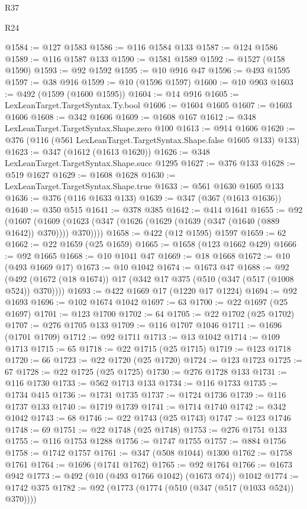 \begin{lexlean}{R37}
\begin{lexlean}{R24}
\begin{coremodule}
{{{{{{{{{{{{{{{{{{{{{{{{{{{{{{{{{{{{{{{{{{{{{{{{{{{{{{{{{{{{{{{{{{{{{{{{{{{{{{{{{{{{{{{{{{{{{{{{{{{{{{{{{{{{{{{{{{{{{{{{{{{{{{{{{{{{{{{{{{{{{{{{{{{{{{{{{{{{{{{{{{{{{{{{{{{{{{{{{{{{{{{{{@1584 := @127 @1583
@1586 := @116 @1584 @133
@1587 := @124 @1586
@1589 := @116 @1587 @133
@1590 := @1581 @1589
@1592 := @1527 (@158 @1590)
@1593 := @92 @1592
@1595 := @10 @916 @47
@1596 := @493 @1595
@1597 := @38 @916
@1599 := @10 (@1596 @1597)
@1600 := @10 @903
@1603 := @492 (@1599 (@1600 @1595))
@1604 := @14 @916
@1605 := LexLeanTarget.TargetSyntax.Ty.bool
@1606 := @1604 @1605
@1607 := @1603 @1606
@1608 := @342 @1606
@1609 := @1608 @167
@1612 := @348 LexLeanTarget.TargetSyntax.Shape.zero @100
@1613 := @914 @1606
@1620 := @376 (@116 (@561 LexLeanTarget.TargetSyntax.Shape.false @1605 @133) @133)
@1623 := @347 (@1612 (@1613 @1620))
@1626 := @348 LexLeanTarget.TargetSyntax.Shape.succ @1295
@1627 := @376 @133
@1628 := @519 @1627
@1629 := @1608 @1628
@1630 := LexLeanTarget.TargetSyntax.Shape.true
@1633 := @561 @1630 @1605 @133
@1636 := @376 (@116 @1633 @133)
@1639 := @347 (@367 (@1613 @1636))
@1640 := @350 @515
@1641 := @378 @385
@1642 := @414 @1641
@1655 := @92
    (@1607 (@1609 (@1623 (@347 (@1626 (@1629 (@1639 (@347 (@1640 (@889 @1642)) @370)))) @370))))
@1658 := @422 (@12 @1595) @1597
@1659 := 62
@1662 := @22 @1659 (@25 @1659)
@1665 := @1658 (@123 @1662 @429)
@1666 := @92 @1665
@1668 := @10 @1041 @47
@1669 := @18 @1668
@1672 := @10 (@493 @1669 @17)
@1673 := @10 @1042
@1674 := @1673 @47
@1688 := @92 (@492 (@1672 (@18 @1674)) @17 (@342 @17 @375 (@510 (@347 (@517 (@1008 @524)) @370))))
@1693 := @422 @1669 @17 (@1220 @17 @1224)
@1694 := @92 @1693
@1696 := @102 @1674 @1042
@1697 := 63
@1700 := @22 @1697 (@25 @1697)
@1701 := @123 @1700
@1702 := 64
@1705 := @22 @1702 (@25 @1702)
@1707 := @276 @1705 @133
@1709 := @116 @1707 @1046
@1711 := @1696 (@1701 @1709)
@1712 := @92 @1711
@1713 := @13 @1042
@1714 := @109 @1713
@1715 := 65
@1718 := @22 @1715 (@25 @1715)
@1719 := @123 @1718
@1720 := 66
@1723 := @22 @1720 (@25 @1720)
@1724 := @123 @1723
@1725 := 67
@1728 := @22 @1725 (@25 @1725)
@1730 := @276 @1728 @133
@1731 := @116 @1730
@1733 := @562 @1713 @133
@1734 := @116 @1733
@1735 := @1734 @415
@1736 := @1731 @1735
@1737 := @1724 @1736
@1739 := @116 @1737 @133
@1740 := @1719 @1739
@1741 := @1714 @1740
@1742 := @342 @1042
@1743 := 68
@1746 := @22 @1743 (@25 @1743)
@1747 := @123 @1746
@1748 := 69
@1751 := @22 @1748 (@25 @1748)
@1753 := @276 @1751 @133
@1755 := @116 @1753 @1288
@1756 := @1747 @1755
@1757 := @884 @1756
@1758 := @1742 @1757
@1761 := @347 (@508 @1044) @1300
@1762 := @1758 @1761
@1764 := @1696 (@1741 @1762)
@1765 := @92 @1764
@1766 := @1673 @942
@1773 := @492 (@10 (@493 @1766 @1042) (@1673 @74)) @1042
@1774 := @1742 @375
@1782 := @92 (@1773 (@1774 (@510 (@347 (@517 (@1033 @524)) @370))))
}}}}}}}}}}}}}}}}}}}}}}}}}}}}}}}}}}}}}}}}}}}}}}}}}}}}}}}}}}}}}}}}}}}}}}}}}}}}}}}}}}}}}}}}}}}}}}}}}}}}}}}}}}}}}}}}}}}}}}}}}}}}}}}}}}}}}}}}}}}}}}}}}}}}}}}}}}}}}}}}}}}}}}}}}}}}}}}}}}}}}}}}}
\end{coremodule}
\end{lexlean}
\end{lexlean}
